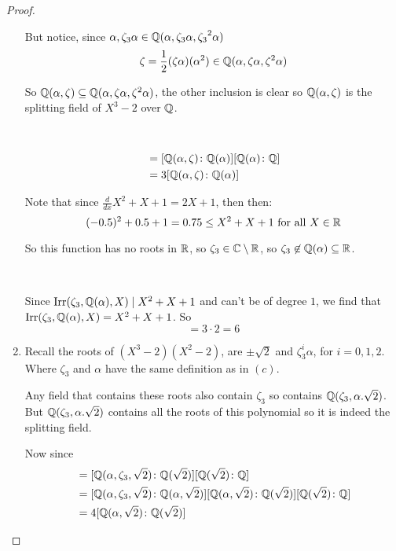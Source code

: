 \begin{exercise}
\begin{proof}
\begin{enumerate}[label=(\alph*)]
        But notice, since $\alpha,\zeta_3\alpha\in \mathbb{Q}(\alpha, \zeta_3\alpha, {\zeta_3}^2\alpha)$\begin{equation}
            \zeta = \frac{1}{2}(\zeta\alpha)(\alpha^2)\in \mathbb{Q}(\alpha, \zeta \alpha, \zeta^2\alpha)
        \end{equation}

        So $\mathbb{Q}(\alpha,\zeta)\subseteq \mathbb{Q}(\alpha, \zeta \alpha, \zeta^2\alpha)$, the other inclusion is clear so $\mathbb{Q}(\alpha, \zeta)$ is the splitting field of $X^3 - 2$ over $\mathbb{Q}$.
        
        \

        \begin{align*}
            [\Q(\alpha,\zeta)\colon \Q] &= [\Q(\alpha,\zeta)\colon\Q(\alpha)][\Q(\alpha)\colon \Q]\\
                                        &= 3[\Q(\alpha,\zeta)\colon\Q(\alpha)]
        \end{align*}
        
        Note that since $\frac{d}{dx}X^2+X+1 = 2X+1$, then then:\begin{equation}
            (-0.5)^2+0.5+1 = 0.75\leq X^2+X+1 \text{ for all }X\in\mathbb{R}
        \end{equation} 

        So this function has no roots in $\mathbb{R}$, so $\zeta_3\in \mathbb{C}\setminus \mathbb{R}$, so $\zeta_3\not\in \mathbb{Q}(\alpha)\subseteq \mathbb{R}$.

        \


        Since $\text{Irr}(\zeta_3, \mathbb{Q}(\alpha), X)\mid X^2+X+1$ and can't be of degree $1$, we find that $\text{Irr}(\zeta_3, \mathbb{Q}(\alpha), X)=X^2+X+1$. So \begin{equation}
            [\Q(\alpha,\zeta)\colon \Q] = 3\cdot 2 = 6
        \end{equation}

        \item Recall the roots of $(X^3-2)(X^2-2)$, are $\pm \sqrt{2}$ and $\zeta_3^i\alpha$, for $i=0,1,2$. Where $\zeta_3$ and $\alpha$ have the same definition as in $(c)$.
        
        Any field that contains these roots also contain $\zeta_3$ so contains $\mathbb{Q}(\zeta_3,\alpha. \sqrt{2})$. But $\mathbb{Q}(\zeta_3,\alpha. \sqrt{2})$ contains all the roots of this polynomial so it is indeed the splitting field.

        Now since\begin{align*}
            [\Q(\alpha, \zeta_3,\sqrt{2})\colon \Q] &= [\Q(\alpha, \zeta_3,\sqrt{2})\colon \Q(\sqrt{2})][\Q(\sqrt{2})\colon \Q]\\ 
            &= [\Q(\alpha, \zeta_3,\sqrt{2})\colon \Q(\alpha, \sqrt{2})][\Q(\alpha,\sqrt{2})\colon \Q(\sqrt{2})][\Q(\sqrt{2})\colon \Q]\\
            &= 4[\Q(\alpha,\sqrt{2})\colon \Q(\sqrt{2})]
        \end{align*}


\end{enumerate}
\end{proof}
\end{exercise}
